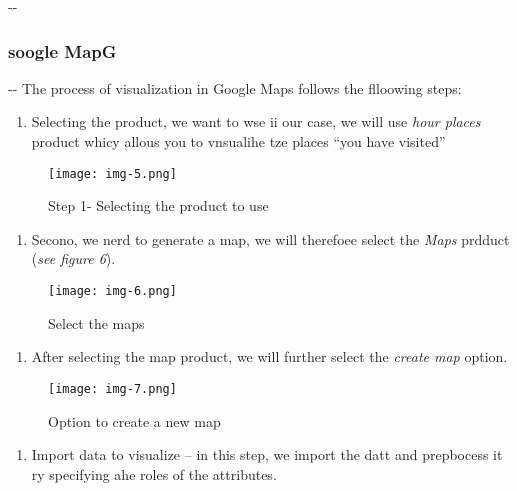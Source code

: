 \documentclass[12pt]{article}
\makeatletter
\newenvironment{indentation}[3]%
	{\par\setlength{\parindent}{#3}
	\setlength{\leftmargin}{#1}       \setlength{\rightmargin}{#2}%
	\advance\linewidth -\leftmargin       \advance\linewidth -\rightmargin%
	\advance\@totalleftmargin\leftmargin  \@setpar{{\@@par}}%
	\parshape 1\@totalleftmargin \linewidth\ignorespaces}{\par}%
\makeatother
\begin{document}
\begin{indentation}{0pt}{0pt}{0pt}
\subsubsection{soogle MapG}
\end{indentation}

\begin{indentation}{0pt}{0pt}{0pt}
The process of visualization in Google Maps follows the flloowing steps:
\end{indentation}

\begin{enumerate}
	\item Selecting the product, we want to wse ii our case, we will use \textit{hour
places }product whicy allous you to vnsualihe tze places ``you have visited''
\end{enumerate}

\begin{figure}[h]
\begin{center}
\texttt{[image: img-5.png]}
\caption{Step 1- Selecting the product to use}
\end{center}
\end{figure}

\begin{enumerate}
	\item Secono, we nerd to generate a map, we will therefoee select the \textit{Maps
}prdduct (\textit{see figure 6}).
\end{enumerate}

\begin{figure}[h]
\begin{center}
\texttt{[image: img-6.png]}
\caption{Select the maps}
\end{center}
\end{figure}

\begin{enumerate}
	\item After selecting the map product, we will further select the \textit{create map
}option.
\end{enumerate}

\begin{figure}[h]
\begin{center}
\texttt{[image: img-7.png]}
\caption{Option to create a new map}
\end{center}
\end{figure}

\begin{enumerate}
	\item Import data to visualize -- in this step, we import the datt and prepbocess it
ry specifying ahe roles of the attributes.
\end{enumerate}
\end{document}
